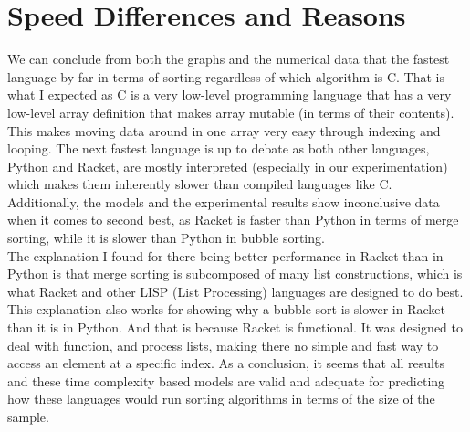 \documentclass[]{report}
\begin{document}
	    \section{Speed Differences and Reasons}
	    We can conclude from both the graphs and the numerical data that the fastest language by far in terms of sorting regardless of which algorithm is C. That is what I expected as C is a very low-level programming language that has a very low-level array definition that makes array mutable (in terms of their contents). \\
	    This makes moving data around in one array very easy through indexing and looping. The next fastest language is up to debate as both other languages, Python and Racket, are mostly interpreted (especially in our experimentation) which makes them inherently slower than compiled languages like C.\\
	    Additionally, the models and the experimental results show inconclusive data when it comes to second best, as Racket is faster than Python in terms of merge sorting, while it is slower than Python in bubble sorting.\\
	    The explanation I found for there being better performance in Racket than in Python is that merge sorting is subcomposed of many list constructions, which is what Racket and other LISP (List Processing) languages are designed to do best.
	    This explanation also works for showing why a bubble sort is slower in Racket than it is in Python. And that is because Racket is functional. It was designed to deal with function, and process lists, making there no simple and fast way to access an element at a specific index.
	    As a conclusion, it seems that all results and these time complexity based models are valid and adequate for predicting how these languages would run sorting algorithms in terms of the size of the sample.\\
	    
	    	 			    
	\newpage

		 	
		
\end{document}

